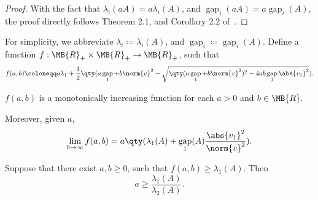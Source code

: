 \documentclass[nobib]{my-handout}
\DeclareMathOperator{\gap}{gap}
\begin{document}
\begin{proof}
	With the fact that $\lambda_i(a A) = a \lambda_i(A)$, and $\gap_i(a A) = a
	\gap_i(A)$, the proof directly follows Theorem 2.1, and Corollary 2.2
	of~\cite{ipsen_refined_2009}.
\end{proof}

For simplicity, we abbreviate $\lambda_i \coloneqq \lambda_i(A)$, and $\gap_i
\coloneqq \gap_i(A)$.  Define a function $f : \MB{R}_{+} \times
\MB{R}_{+} \to \MB{R}_{+}$, such that
\begin{equation}\label{eq:function_of_lmin_lbound}
	f(a,b) \coloneqq
	a \lambda_1 + \frac{1}{2} \qty(a \gap_1 + b \norm{v}^2 - \sqrt{\qty(a
	\gap_1 + b \norm{v}^2)^2 - 4 ab \gap_1 \abs{v_1}^2}).
\end{equation}

\begin{lemma}
	$f(a, b)$ is a monotonically increasing function for each $a > 0$ and $b
	\in \MB{R}$.

	Moreover, given $a$,
	\begin{equation*}
		\lim_{b \to \infty} f(a, b) = a \qty(\lambda_1(A) + \gap_1(A)
		\frac{\abs{v_1}^2}{\norm{v}^2}).
	\end{equation*}
\end{lemma}

\begin{lemma}
	Suppose that there exist $a, b \ge 0$, such that $f(a, b) \ge
	\lambda_1(A)$. Then
	\begin{equation}\label{eq:neccessary_cond_for_a}
		a \ge \frac{\lambda_1(A)}{\lambda_2(A)}.
	\end{equation}
\end{lemma}
\end{document}
